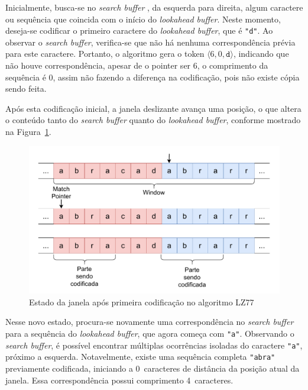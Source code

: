 Inicialmente, busca-se no \textit{search buffer} , da esquerda para direita, algum caractere ou sequência
que coincida com o início do \textit{lookahead buffer}. Neste momento,
deseja-se codificar o primeiro caractere do \textit{lookahead buffer}, que é
\texttt{"d"}. Ao observar o \textit{search buffer}, verifica-se que não há
nenhuma correspondência prévia para este caractere. Portanto, o algoritmo gera
o token $\langle 6, 0, \texttt{d} \rangle$, indicando que não houve
correspondência, apesar de o pointer ser 6, o comprimento da sequência
 é 0, assim não fazendo a diferença na codificação, pois não existe cópia sendo feita.

Após esta codificação inicial, a janela deslizante avança uma posição, o que
altera o conteúdo tanto do \textit{search buffer} quanto do \textit{lookahead
  buffer}, conforme mostrado na Figura~\ref{fig:Estado_1_LZ77}.

\begin{figure}[htp]
  \centering
  \caption{Estado da janela após primeira codificação no algoritmo LZ77}
  \label{fig:Estado_1_LZ77}
  \includegraphics[width=15cm]{figuras/DiagramasTCC-LZ77-Estado-1.pdf}
\end{figure}

Nesse novo estado, procura-se novamente uma correspondência no \textit{search
  buffer} para a sequência do \textit{lookahead buffer}, que agora começa com
\texttt{"a"}. Observando o \textit{search buffer}, é possível encontrar
múltiplas ocorrências isoladas do caractere \texttt{"a"}, próximo a esquerda. Notavelmente, existe uma
sequência completa \texttt{"abra"} previamente codificada, iniciando a
0~caracteres de distância da posição atual da janela. Essa correspondência
possui comprimento 4~caracteres.

